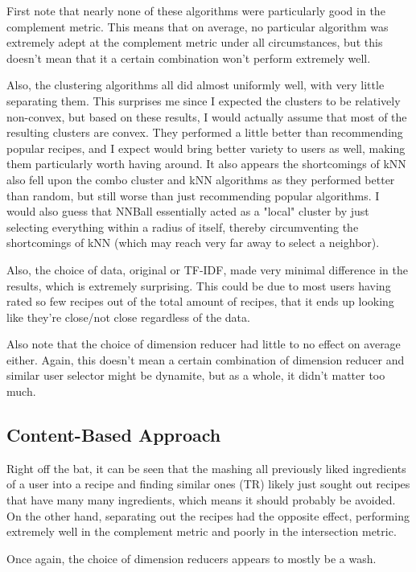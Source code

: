 \documentclass[11pt]{article}
\begin{document}
First note that nearly none of these algorithms were particularly good in the complement metric. This means that on average, no particular algorithm was extremely adept at the complement metric under all circumstances, but this doesn't mean that it a certain combination won't perform extremely well.

Also, the clustering algorithms all did almost uniformly well, with very little separating them. This surprises me since I expected the clusters to be relatively non-convex, but based on these results, I would actually assume that most of the resulting clusters are convex. They performed a little better than recommending popular recipes, and I expect would bring better variety to users as well, making them particularly worth having around. It also appears the shortcomings of kNN also fell upon the combo cluster and kNN algorithms as they performed better than random, but still worse than just recommending popular algorithms. I would also guess that NNBall essentially acted as a "local" cluster by just selecting everything within a radius of itself, thereby circumventing the shortcomings of kNN (which may reach very far away to select a neighbor).

Also, the choice of data, original or TF-IDF, made very minimal difference in the results, which is extremely surprising. This could be due to most users having rated so few recipes out of the total amount of recipes, that it ends up looking like they're close/not close regardless of the data. 

Also note that the choice of dimension reducer had little to no effect on average either. Again, this doesn't mean a certain combination of dimension reducer and similar user selector might be dynamite, but as a whole, it didn't matter too much.

\subsection{Content-Based Approach}

Right off the bat, it can be seen that the mashing all previously liked ingredients of a user into a recipe and finding similar ones (TR) likely just sought out recipes that have many many ingredients, which means it should probably be avoided. On the other hand, separating out the recipes had the opposite effect, performing extremely well in the complement metric and poorly in the intersection metric.

Once again, the choice of dimension reducers appears to mostly be a wash.
\end{document}
